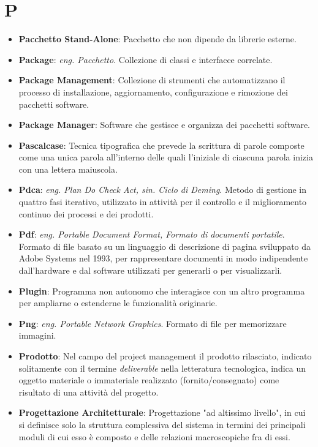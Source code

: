 \section{P}
\begin{itemize}
	\item
	\textbf{Pacchetto Stand-Alone}: Pacchetto che non dipende da librerie esterne.
	\item
	\textbf{Package}: \textit{eng. Pacchetto}. Collezione di classi e interfacce correlate.
	\item
	\textbf{Package Management}: Collezione di strumenti che automatizzano il processo di installazione, aggiornamento, configurazione e rimozione dei pacchetti software.
	\item
	\textbf{Package Manager}: Software che gestisce e organizza dei pacchetti software.
	\item
	\textbf{Pascalcase}: Tecnica tipografica che prevede la scrittura di parole composte come una unica parola all'interno delle quali l'iniziale di ciascuna parola inizia con una lettera maiuscola.
	\item
	\textbf{Pdca}: \textit{eng. Plan Do Check Act, sin. Ciclo di Deming}. Metodo di gestione in quattro fasi iterativo, utilizzato in attività per il controllo e il miglioramento continuo dei processi e dei prodotti.
	\item
	\textbf{Pdf}: \textit{eng. Portable Document Format, Formato di documenti portatile}. Formato di file basato su un linguaggio di descrizione di pagina sviluppato da Adobe Systems nel 1993, per rappresentare documenti in modo indipendente dall'hardware e dal software utilizzati per generarli o per visualizzarli.
	\item
	\textbf{Plugin}: Programma non autonomo che interagisce con un altro programma per ampliarne o estenderne le funzionalità originarie.
	\item
	\textbf{Png}: \textit{eng. Portable Network Graphics}. Formato di file per memorizzare immagini.
	\item
	\textbf{Prodotto}: Nel campo del project management il prodotto rilasciato, indicato solitamente con il termine \textit{deliverable} nella letteratura tecnologica, indica un oggetto materiale o immateriale realizzato (fornito/consegnato) come risultato di una attività del progetto.
	\item
	\textbf{Progettazione Architetturale}: Progettazione "ad altissimo livello", in cui si definisce solo la struttura complessiva del sistema in termini dei principali moduli di cui esso è composto e delle relazioni macroscopiche fra di essi.

\end{itemize}
